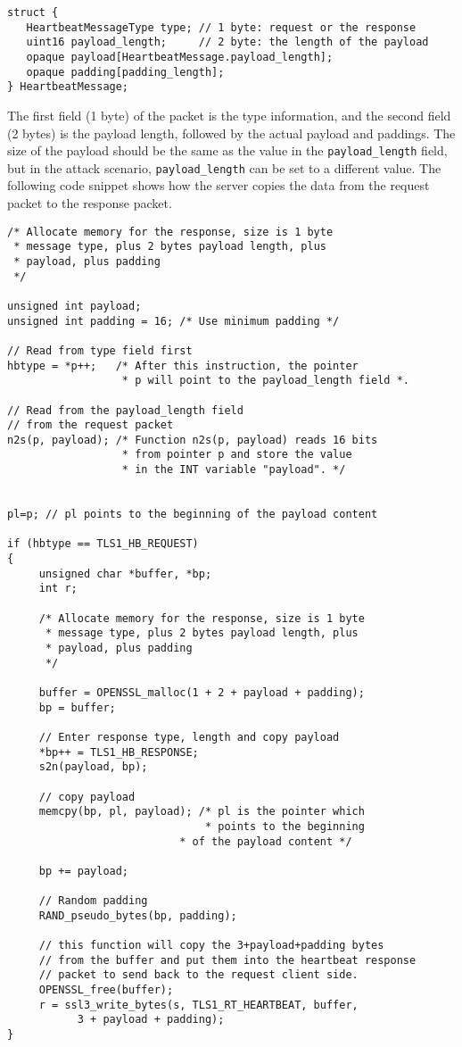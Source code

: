 \begin{lstlisting}
struct {
   HeartbeatMessageType type; // 1 byte: request or the response
   uint16 payload_length;     // 2 byte: the length of the payload
   opaque payload[HeartbeatMessage.payload_length]; 
   opaque padding[padding_length]; 
} HeartbeatMessage;
\end{lstlisting}


The first field (1 byte) of the packet is the type information, 
and the second field (2 bytes) is the payload length, followed by the 
actual payload and paddings. The size of the payload should be the same as
the value in the \texttt{payload\_length} field, but in the attack
scenario, \texttt{payload\_length} can be set to a different value. The
following code snippet shows how the server 
copies the data from the request packet to the response packet. 



\begin{lstlisting}[caption={Process the Heartbeat request packet and generate the response packet}, 
      label=heartbleed:source]
/* Allocate memory for the response, size is 1 byte
 * message type, plus 2 bytes payload length, plus
 * payload, plus padding
 */

unsigned int payload;
unsigned int padding = 16; /* Use minimum padding */

// Read from type field first  
hbtype = *p++;   /* After this instruction, the pointer
                  * p will point to the payload_length field *.

// Read from the payload_length field 
// from the request packet 
n2s(p, payload); /* Function n2s(p, payload) reads 16 bits
                  * from pointer p and store the value 
                  * in the INT variable "payload". */
			  
			  
pl=p; // pl points to the beginning of the payload content
			  
if (hbtype == TLS1_HB_REQUEST)
{
     unsigned char *buffer, *bp;
     int r;

     /* Allocate memory for the response, size is 1 byte
      * message type, plus 2 bytes payload length, plus
      * payload, plus padding
      */

     buffer = OPENSSL_malloc(1 + 2 + payload + padding);
     bp = buffer;

     // Enter response type, length and copy payload 
     *bp++ = TLS1_HB_RESPONSE;
     s2n(payload, bp);
        
     // copy payload 
     memcpy(bp, pl, payload); /* pl is the pointer which 
                               * points to the beginning 
	                       * of the payload content */

     bp += payload;
			    
     // Random padding
     RAND_pseudo_bytes(bp, padding);			    

     // this function will copy the 3+payload+padding bytes
     // from the buffer and put them into the heartbeat response 
     // packet to send back to the request client side.
     OPENSSL_free(buffer);
     r = ssl3_write_bytes(s, TLS1_RT_HEARTBEAT, buffer,
           3 + payload + padding); 
}
\end{lstlisting}


